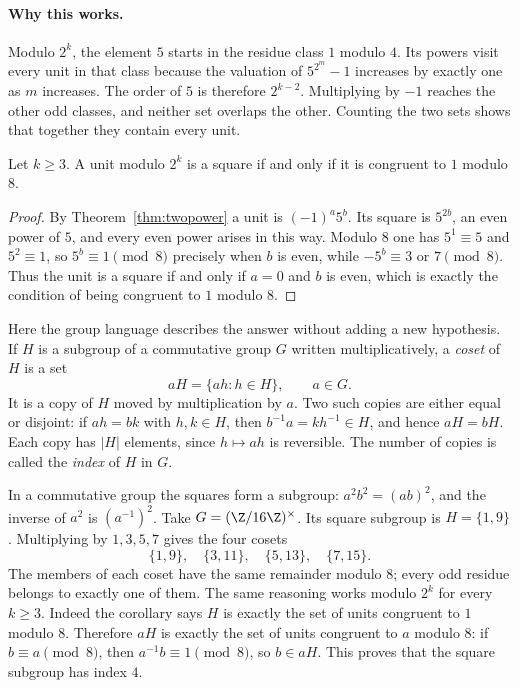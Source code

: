 \paragraph{Why this works.}
Modulo $2^k$, the element $5$ starts in the residue class $1$ modulo $4$. Its powers visit every unit in that class because the valuation of $5^{2^m}-1$ increases by exactly one as $m$ increases. The order of $5$ is therefore $2^{k-2}$. Multiplying by $-1$ reaches the other odd classes, and neither set overlaps the other. Counting the two sets shows that together they contain every unit.

\begin{corollary}\label{cor:mod8squares}
Let $k\ge3$. A unit modulo $2^k$ is a square if and only if it is congruent to $1$ modulo $8$.
\end{corollary}
\begin{proof}
By Theorem~\ref{thm:twopower} a unit is $(-1)^a5^b$. Its square is $5^{2b}$, an even power of $5$, and every even power arises in this way. Modulo $8$ one has $5^1\equiv5$ and $5^2\equiv1$, so $5^b\equiv1\pmod8$ precisely when $b$ is even, while $-5^b\equiv3$ or $7\pmod8$. Thus the unit is a square if and only if $a=0$ and $b$ is even, which is exactly the condition of being congruent to $1$ modulo $8$.
\end{proof}

Here the group language describes the answer without adding a new hypothesis. If $H$ is a subgroup of a commutative group $G$ written multiplicatively, a \emph{coset} of $H$ is a set
\[
aH=\{ah:h\in H\},\qquad a\in G.
\]
It is a copy of $H$ moved by multiplication by $a$. Two such copies are either equal or disjoint: if $ah=bk$ with $h,k\in H$, then $b^{-1}a=kh^{-1}\in H$, and hence $aH=bH$. Each copy has $|H|$ elements, since $h\mapsto ah$ is reversible. The number of copies is called the \emph{index} of $H$ in $G$.

In a commutative group the squares form a subgroup: $a^2b^2=(ab)^2$, and the inverse of $a^2$ is $(a^{-1})^2$. Take $G=(\Z/16\Z)^\times$. Its square subgroup is $H=\{1,9\}$. Multiplying by $1,3,5,7$ gives the four cosets
\[
\{1,9\},\quad\{3,11\},\quad\{5,13\},\quad\{7,15\}.
\]
The members of each coset have the same remainder modulo $8$; every odd residue belongs to exactly one of them. The same reasoning works modulo $2^k$ for every $k\ge3$. Indeed the corollary says $H$ is exactly the set of units congruent to $1$ modulo $8$. Therefore $aH$ is exactly the set of units congruent to $a$ modulo $8$: if $b\equiv a\pmod8$, then $a^{-1}b\equiv1\pmod8$, so $b\in aH$. This proves that the square subgroup has index $4$.

